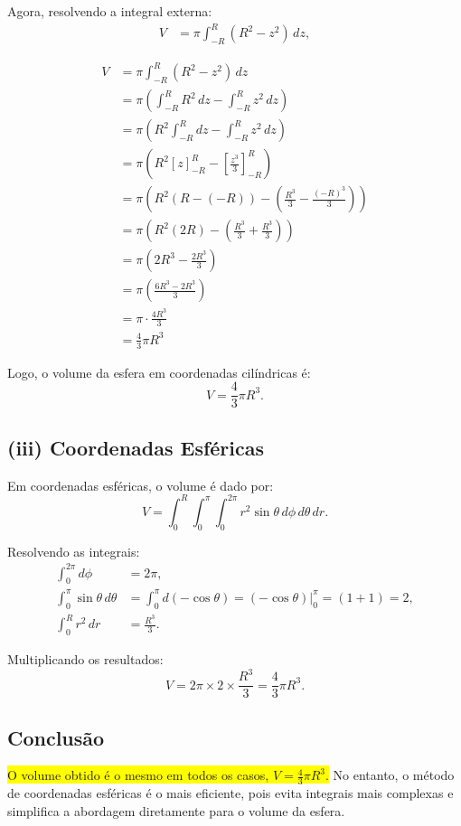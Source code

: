 \documentclass[a4paper,12pt]{article}
\begin{document}
\begin{flushleft}
Agora, resolvendo a integral externa:
\begin{align*}
V &= \pi \int_{-R}^{R} (R^2 - z^2) \, dz,
\end{align*}

\begin{align*}
    V &= \pi \int_{-R}^{R} (R^2 - z^2) \, dz \\
      &= \pi \left( \int_{-R}^{R} R^2 \, dz - \int_{-R}^{R} z^2 \, dz \right) \\
      &= \pi \left( R^2 \int_{-R}^{R} dz - \int_{-R}^{R} z^2 \, dz \right) \\
      &= \pi \left( R^2 [z]_{-R}^{R} - \left[ \frac{z^3}{3} \right]_{-R}^{R} \right) \\
      &= \pi \left( R^2 (R - (-R)) - \left( \frac{R^3}{3} - \frac{(-R)^3}{3} \right) \right) \\
      &= \pi \left( R^2 (2R) - \left( \frac{R^3}{3} + \frac{R^3}{3} \right) \right) \\
      &= \pi \left( 2R^3 - \frac{2R^3}{3} \right) \\
      &= \pi \left( \frac{6R^3 - 2R^3}{3} \right) \\
      &= \pi \cdot \frac{4R^3}{3} \\
      &= \boxed{\frac{4}{3} \pi R^3}
\end{align*}

Logo, o volume da esfera em coordenadas cilíndricas é:
\begin{equation}
\boxed{V = \frac{4}{3} \pi R^3.}
\end{equation}

\subsection*{(iii) Coordenadas Esféricas}
Em coordenadas esféricas, o volume é dado por:
\begin{equation}
V = \int_0^R \int_0^{\pi} \int_0^{2\pi} r^2 \sin \theta \, d\phi \, d\theta \, dr.
\end{equation}

Resolvendo as integrais:
\begin{align*}
\int_0^{2\pi} d\phi &= 2\pi, \\
\int_0^{\pi} \sin\theta \, d\theta &= \int_0^{\pi} d(-\cos\theta) = (-\cos\theta) \Big|_0^{\pi} = (1 + 1) = 2, \\
\int_0^R r^2 \, dr &= \frac{R^3}{3}.
\end{align*}

Multiplicando os resultados:
\begin{equation}
V = 2\pi \times 2 \times \frac{R^3}{3} = \frac{4}{3} \pi R^3.
\end{equation}

\subsection*{Conclusão}
\colorbox{yellow}{O volume obtido é o mesmo em todos os casos, $V = \frac{4}{3} \pi R^3$.} No entanto, o método de coordenadas esféricas 
é o mais eficiente, pois evita integrais mais complexas e simplifica a abordagem diretamente para o volume da esfera.
\end{flushleft}
\end{document}
